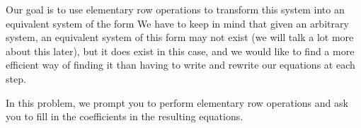 \documentclass{ximera}
\begin{document}
Our goal is to use elementary row operations to transform this system into an equivalent system of the form
 We have to keep in mind that given an arbitrary system, an equivalent system of this form may not exist (we will talk a lot more about this later), but it does exist in this case, and we would like to find a more efficient way of finding it than having to write and rewrite our equations at each step.   
 
In this problem, we prompt you to perform elementary row operations and ask you to fill in the coefficients in the resulting equations.
 
    
 
\end{document}
